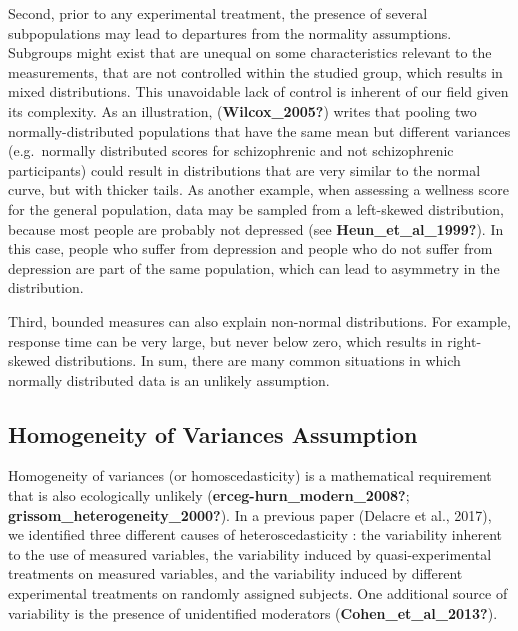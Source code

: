 \documentclass[
  english,
  man]{apa6}
\begin{document}
Second, prior to any experimental treatment, the presence of several subpopulations may lead to departures from the normality assumptions. Subgroups might exist that are unequal on some characteristics relevant to the measurements, that are not controlled within the studied group, which results in mixed distributions. This unavoidable lack of control is inherent of our field given its complexity. As an illustration, (\textbf{Wilcox\_2005?}) writes that pooling two normally-distributed populations that have the same mean but different variances (e.g.~normally distributed scores for schizophrenic and not schizophrenic participants) could result in distributions that are very similar to the normal curve, but with thicker tails. As another example, when assessing a wellness score for the general population, data may be sampled from a left-skewed distribution, because most people are probably not depressed (see \textbf{Heun\_et\_al\_1999?}). In this case, people who suffer from depression and people who do not suffer from depression are part of the same population, which can lead to asymmetry in the distribution.

Third, bounded measures can also explain non-normal distributions. For example, response time can be very large, but never below zero, which results in right-skewed distributions. In sum, there are many common situations in which normally distributed data is an unlikely assumption.

\hypertarget{homogeneity-of-variances-assumption}{%
\subsection{Homogeneity of Variances Assumption}\label{homogeneity-of-variances-assumption}}

Homogeneity of variances (or homoscedasticity) is a mathematical requirement that is also ecologically unlikely (\textbf{erceg-hurn\_modern\_2008?}; \textbf{grissom\_heterogeneity\_2000?}). In a previous paper (Delacre et al., 2017), we identified three different causes of heteroscedasticity : the variability inherent to the use of measured variables, the variability induced by quasi-experimental treatments on measured variables, and the variability induced by different experimental treatments on randomly assigned subjects. One additional source of variability is the presence of unidentified moderators (\textbf{Cohen\_et\_al\_2013?}).
\end{document}
